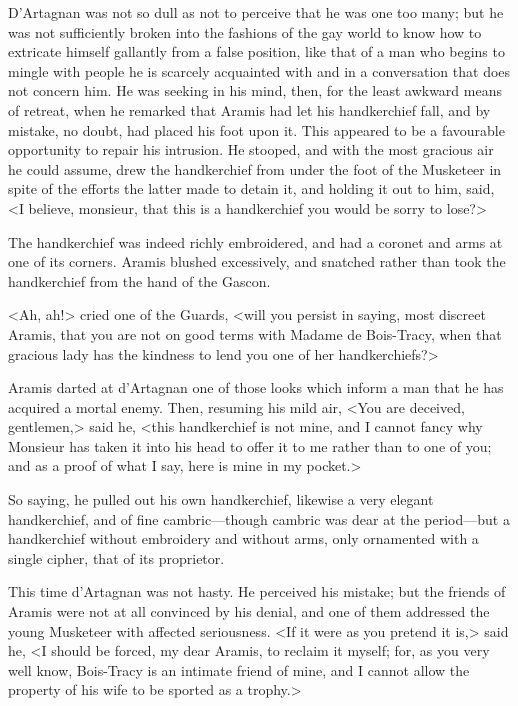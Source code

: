 D'Artagnan was not so dull as not to perceive that he was one too many; but he was not sufficiently broken into the fashions of the gay world to know how to extricate himself gallantly from a false position, like that of a man who begins to mingle with people he is scarcely acquainted with and in a conversation that does not concern him. He was seeking in his mind, then, for the least awkward means of retreat, when he remarked that Aramis had let his handkerchief fall, and by mistake, no doubt, had placed his foot upon it. This appeared to be a favourable opportunity to repair his intrusion. He stooped, and with the most gracious air he could assume, drew the handkerchief from under the foot of the Musketeer in spite of the efforts the latter made to detain it, and holding it out to him, said, <I believe, monsieur, that this is a handkerchief you would be sorry to lose?> 

The handkerchief was indeed richly embroidered, and had a coronet and arms at one of its corners. Aramis blushed excessively, and snatched rather than took the handkerchief from the hand of the Gascon. 

<Ah, ah!> cried one of the Guards, <will you persist in saying, most discreet Aramis, that you are not on good terms with Madame de Bois-Tracy, when that gracious lady has the kindness to lend you one of her handkerchiefs?> 

Aramis darted at d'Artagnan one of those looks which inform a man that he has acquired a mortal enemy. Then, resuming his mild air, <You are deceived, gentlemen,> said he, <this handkerchief is not mine, and I cannot fancy why Monsieur has taken it into his head to offer it to me rather than to one of you; and as a proof of what I say, here is mine in my pocket.> 

So saying, he pulled out his own handkerchief, likewise a very elegant handkerchief, and of fine cambric---though cambric was dear at the period---but a handkerchief without embroidery and without arms, only ornamented with a single cipher, that of its proprietor. 

This time d'Artagnan was not hasty. He perceived his mistake; but the friends of Aramis were not at all convinced by his denial, and one of them addressed the young Musketeer with affected seriousness. <If it were as you pretend it is,> said he, <I should be forced, my dear Aramis, to reclaim it myself; for, as you very well know, Bois-Tracy is an intimate friend of mine, and I cannot allow the property of his wife to be sported as a trophy.> 

